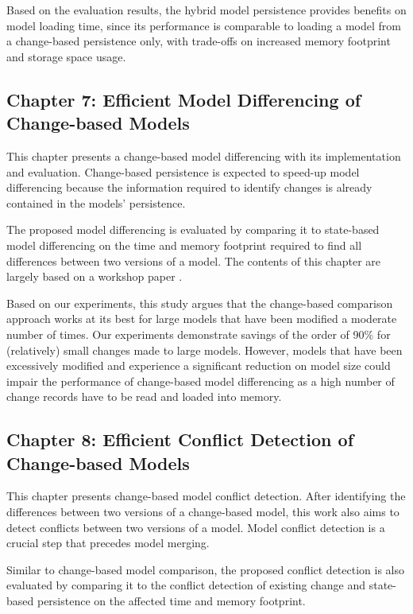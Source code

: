 Based on the evaluation results, the hybrid model persistence provides benefits on model loading time, since its performance is comparable to loading a model from a change-based persistence only, with trade-offs on increased memory footprint and storage space usage. 

\subsection{Chapter 7: Efficient Model Differencing of Change-based Models}
\label{sec:chapter_6_model_differencing}
This chapter presents a change-based model differencing with its implementation and evaluation. Change-based persistence is expected to speed-up model differencing because the information required to identify changes is already contained in the models' persistence. 

The proposed model differencing is evaluated by comparing it to state-based model differencing on the time and memory footprint required to find all differences between two versions of a model. The contents of this chapter are largely based on a workshop paper \cite{yohannis2019efficient}.

Based on our experiments, this study argues that the change-based comparison approach works at its best for large models that have been modified a moderate number of times. Our experiments demonstrate savings of the order of 90\% for (relatively) small changes made to large models. However, models that have been excessively modified and experience a significant reduction on model size could impair the performance of change-based model differencing as a high number of change records have to be read and loaded into memory.

\subsection{Chapter 8: Efficient Conflict Detection of Change-based Models}
\label{sec:chapter_7_conflict_detection}
This chapter presents change-based model conflict detection. After identifying the differences between two versions of a change-based model, this work also aims to detect conflicts between two versions of a model. Model conflict detection is a crucial step that precedes model merging.

Similar to change-based model comparison, the proposed conflict detection is also evaluated by comparing it to the conflict detection of existing change and state-based persistence on the affected time and memory footprint.

